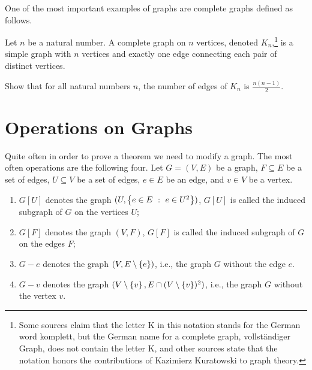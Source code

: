 One of the most important examples of graphs are complete graphs defined as
follows.
\begin{definition}
  Let $n$ be a natural number. A complete graph on $n$ vertices, denoted
  $K_n$,\footnote[][-2cm]{%
    Some sources claim that the letter K in this notation stands for the German
    word komplett, but the German name for a complete graph, vollst\"{a}ndiger
    Graph, does not contain the letter K, and other sources state that the
    notation honors the contributions of Kazimierz Kuratowski to graph theory.
  } 
  is a simple graph with $n$ vertices and exactly one edge connecting
  each pair of distinct vertices.
\end{definition}

\begin{exercise}
\label{exercise:maximal-number-of-edges}
  Show that for all natural numbers $n$, the number of edges of $K_n$
  is $\frac{n(n - 1)}{2}$.
\end{exercise}

\section{Operations on Graphs}
Quite often in order to prove a theorem we need to modify a graph. The most
often operations are the following four. Let $G = (V, E)$ be a graph,
$F \subseteq E$ be a set of edges, $U \subseteq V$ be a set of edges,
$e \in E$ be an edge, and $v \in V$ be a vertex.
\begin{enumerate}
  \item $G[U]$ denotes the graph $(U, \set[e \in U^2]{e \in E})$,
    $G[U]$ is called the induced subgraph of $G$ on the vertices $U$;
  \item $G[F]$ denotes the graph $(V, F)$, $G[F]$ is called the induced
    subgraph of $G$ on the edges $F$;
  \item $G - e$ denotes the graph $(V, E \setminus \set{e})$, i.e., the graph $G$
    without the edge $e$.
  \item $G - v$ denotes the graph
    $(V \setminus \set{v}, E \cap (V \setminus \set{v})^2)$, i.e., the graph $G$
    without the vertex $v$.
\end{enumerate}

